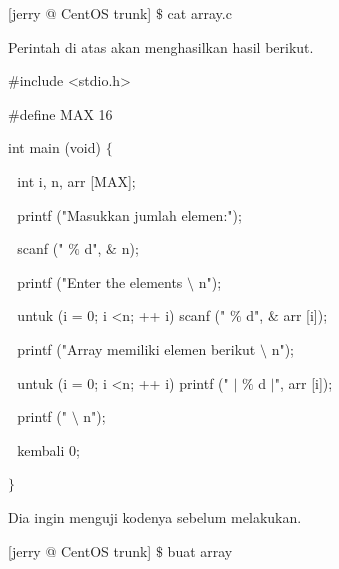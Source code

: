 \noindent 
 \hspace*{0.5in} [jerry @ CentOS trunk]  $  \$  $ cat array.c \par
\noindent 
 \hspace*{0.5in} Perintah di atas akan menghasilkan hasil berikut. \par
\noindent 
 \hspace*{0.5in}  $  \#  $include <stdio.h> \par
\noindent 
 \hspace*{0.5in}  $  \#  $define MAX 16 \par
\noindent 
 \hspace*{0.5in} int main (void)  $  \{  $ \par
\noindent 
 \hspace*{0.5in}  $  $ $  $ $  $int i, n, arr [MAX]; \par
\noindent 
 \hspace*{0.5in}  $  $ $  $ $  $printf ("Masukkan jumlah elemen:"); \par
\noindent 
 \hspace*{0.5in}  $  $ $  $ $  $scanf (" $  \%  $ d",  $  \&  $ n); \par
\noindent 
 \hspace*{0.5in}  $  $ $  $ $  $printf ("Enter the elements  $  \setminus  $ n"); \par
\noindent 
 \hspace*{0.5in}  $  $ $  $ $  $untuk (i = 0; i <n; ++ i) scanf (" $  \%  $ d",  $  \&  $ arr [i]); \par
\noindent 
 \hspace*{0.5in}  $  $ $  $ $  $printf ("Array memiliki elemen berikut  $  \setminus  $ n"); \par
\noindent 
 \hspace*{0.5in}  $  $ $  $ $  $untuk (i = 0; i <n; ++ i) printf (" $  \vert  $ $  \%  $ d  $  \vert  $", arr [i]); \par
\noindent 
 \hspace*{0.5in}  $  $ $  $ $  $printf (" $  \setminus  $ n"); \par
\noindent 
 \hspace*{0.5in}  $  $ $  $ $  $kembali 0; \par
\noindent 
 \hspace*{0.5in}  $  \}  $ \par
 \vspace{\baselineskip}
\noindent 
Dia ingin menguji kodenya sebelum melakukan. \par
\noindent 
 \hspace*{0.5in} [jerry @ CentOS trunk]  $  \$  $ buat array \par
